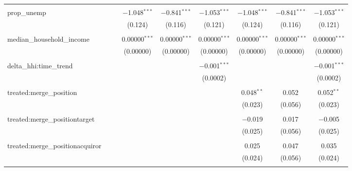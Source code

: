 \begin{table}[H]
{\begin{tabular}{@{\extracolsep{5pt}}lcccccccc}
   & & & & & & & & \\  

  prop\_unemp &  &  & $-$1.048$^{***}$ & $-$0.841$^{***}$ & $-$1.053$^{***}$ & $-$1.048$^{***}$ & $-$0.841$^{***}$ & $-$1.053$^{***}$ \\  

   &  &  & (0.124) & (0.116) & (0.121) & (0.124) & (0.116) & (0.121) \\  

   & & & & & & & & \\  

  median\_household\_income &  &  & 0.00000$^{***}$ & 0.00000$^{***}$ & 0.00000$^{***}$ & 0.00000$^{***}$ & 0.00000$^{***}$ & 0.00000$^{***}$ \\  

   &  &  & (0.00000) & (0.00000) & (0.00000) & (0.00000) & (0.00000) & (0.00000) \\  

   & & & & & & & & \\  

  delta\_hhi:time\_trend &  &  &  &  & $-$0.001$^{***}$ &  &  & $-$0.001$^{***}$ \\  

   &  &  &  &  & (0.0002) &  &  & (0.0002) \\  

   & & & & & & & & \\  

  treated:merge\_position &  &  &  &  &  & 0.048$^{**}$ & 0.052 & 0.052$^{**}$ \\  

   &  &  &  &  &  & (0.023) & (0.056) & (0.023) \\  

   & & & & & & & & \\  

  treated:merge\_positiontarget &  &  &  &  &  & $-$0.019 & 0.017 & $-$0.005 \\  

   &  &  &  &  &  & (0.025) & (0.056) & (0.025) \\  

   & & & & & & & & \\  

  treated:merge\_positionacquiror &  &  &  &  &  & 0.025 & 0.047 & 0.035 \\  

   &  &  &  &  &  & (0.024) & (0.056) & (0.024) \\  

   & & & & & & & & \\  


\end{tabular}}
\end{table}
